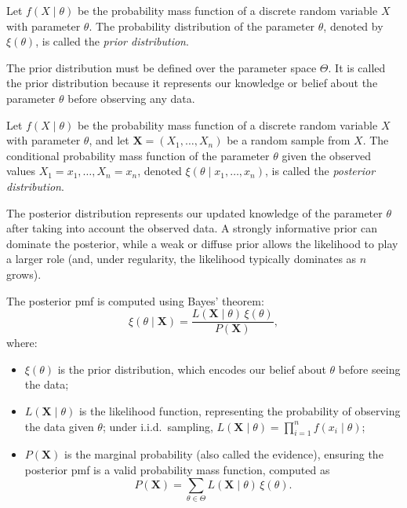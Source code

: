 \begin{definition}
Let $f\left(X \mid \theta \right)$ be the probability mass function of a discrete random variable $X$ with parameter $\theta$. The probability distribution of the parameter $\theta$, denoted by $\xi\left(\theta\right)$, is called the \emph{prior distribution}.
\end{definition}

The prior distribution must be defined over the parameter space $\Theta$. It is called the prior distribution because it represents our knowledge or belief about the parameter $\theta$ before observing any data.

\begin{definition}
Let $f\left(X \mid \theta \right)$ be the probability mass function of a discrete random variable $X$ with parameter $\theta$, and let $\mathbf{X}=\left(X_{1},\ldots,X_{n}\right)$ be a random sample from $X$. The conditional probability mass function of the parameter $\theta$ given the observed values $X_1 = x_1, \ldots, X_n = x_n$, denoted $\xi \left( \theta \mid x_1, \ldots, x_n \right)$, is called the \emph{posterior distribution}.
\end{definition}

The posterior distribution represents our updated knowledge of the parameter $\theta$ after taking into account the observed data. A strongly informative prior can dominate the posterior, while a weak or diffuse prior allows the likelihood to play a larger role (and, under regularity, the likelihood typically dominates as $n$ grows).

The posterior pmf is computed using Bayes' theorem:
\[
\xi(\theta \mid \mathbf{X}) = \frac{L(\mathbf{X} \mid \theta)\,\xi(\theta)}{P(\mathbf{X})},
\]
where:
\begin{itemize}
\item \(\xi(\theta)\) is the prior distribution, which encodes our belief about \(\theta\) before seeing the data;
\item \(L(\mathbf{X} \mid \theta)\) is the likelihood function, representing the probability of observing the data given \(\theta\); under i.i.d.\ sampling, \(L(\mathbf{X}\mid\theta)=\prod_{i=1}^n f(x_i\mid\theta)\);
\item \(P(\mathbf{X})\) is the marginal probability (also called the evidence), ensuring the posterior pmf is a valid probability mass function, computed as
\[
P(\mathbf{X}) = \sum_{\theta \in \Theta} L(\mathbf{X} \mid \theta)\,\xi(\theta).
\]
\end{itemize}

